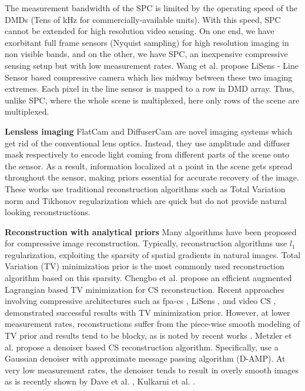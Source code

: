 \documentclass[journal,twoside]{IEEEtran}
\begin{document}
The measurement bandwidth of the SPC is limited by the operating speed of the DMDs (Tens of kHz for commercially-available units). With this speed, SPC cannot be extended for high resolution video sensing. On one end, we have exorbitant full frame sensors (Nyquist sampling) for high resolution imaging in non visible bands, and on the other, we have SPC, an inexpensive compressive sensing setup but with low measurement rates. Wang et al. \cite{wang2015lisens} propose LiSens - Line Sensor based compressive camera which lies midway between these two imaging extremes. Each pixel in the line sensor is mapped to a row in DMD array. Thus, unlike SPC, where the whole scene is multiplexed, here only rows of the scene are multiplexed. %

\textbf{Lensless imaging} FlatCam \cite{asif2017flatcam} and DiffuserCam \cite{antipa20173d} are novel imaging systems which get rid of the conventional lens optics. Instead, they use amplitude and diffuser mask respectively to encode light coming from different parts of the scene onto the sensor. As a result, information localized at a point in the scene gets spread throughout the sensor, making priors essential for accurate recovery of the image. These works use traditional reconstruction algorithms such as Total Variation norm and Tikhonov regularization which are quick but do not provide natural looking reconstructions. 

\textbf{Reconstruction with analytical priors} Many algorithms have been proposed for compressive image reconstruction. Typically, reconstruction algorithms use $l_1$ regularization, exploiting the sparsity of spatial gradients in natural images. Total Variation (TV) minimization prior \cite{rudin1992nonlinear, chambolle2004algorithm} is the most commonly used reconstruction algorithm based on this sparsity. Chengbo et al. \cite{li2013efficient} propose an efficient augmented Lagrangian based TV minimization for CS reconstruction. Recent approaches involving compressive architectures such as fpa-cs \cite{chen2015fpa}, LiSens \cite{wang2015lisens}, and video CS \cite{sankaranarayanan2012cs}, demonstrated successful results with TV minimization prior. However, at lower measurement rates, reconstructions suffer from the piece-wise smooth modeling of TV prior and results tend to be blocky, as is noted by recent works \cite{kulkarni2016reconnet, dave2017compressive}. Metzler et al. \cite{metzler2016denoising} propose a denoiser based CS reconstruction algorithm. Specifically, use a Gaussian denoiser with approximate message passing algorithm (D-AMP). At very low measurement rates, the denoiser tends to result in overly smooth images as is recently shown by Dave et al. \cite{dave2017compressive}, Kulkarni et al. \cite{kulkarni2016reconnet}.
\end{document}
